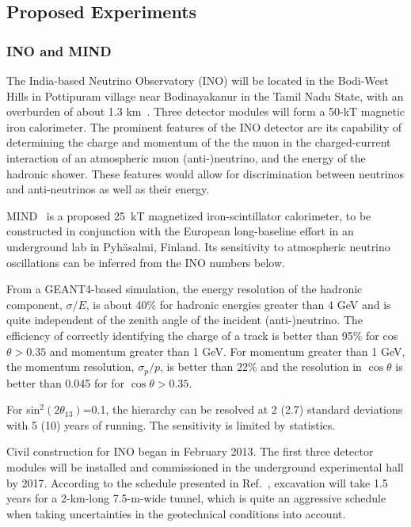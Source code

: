 \subsection{Proposed Experiments}\label{atm:expts}

\subsubsection{INO and MIND}

The India-based Neutrino Observatory (INO) will be located in the Bodi-West Hills in Pottipuram village
near Bodinayakanur in the Tamil Nadu State, with an overburden of about
1.3 km~\cite{atm:Dighe}.  Three
detector modules will form a 50-kT magnetic iron calorimeter.   The prominent features of the INO detector are its
capability of determining the charge and momentum of the the muon in
the charged-current interaction of an atmospheric muon
(anti-)neutrino, and the energy of the hadronic shower.  These
features would allow for discrimination between neutrinos and
anti-neutrinos as well as their energy.

MIND~\cite{nonus:LBNO_LOI} is a proposed 25~kT magnetized
iron-scintillator calorimeter, to be constructed in conjunction with
the European long-baseline effort in an underground lab in
Pyh\"asalmi, Finland. Its sensitivity to atmospheric neutrino
oscillations can be inferred from the INO numbers below. 

From a GEANT4-based simulation, the energy resolution of the hadronic
component, $\sigma/E$, is about 40\% for hadronic energies greater
than 4 GeV and is quite independent of the zenith angle of the
incident (anti-)neutrino.  The efficiency of correctly identifying the
charge of a track is better than 95\% for cos$\theta>0.35$ and
momentum greater than 1 GeV.  For momentum greater than 1 GeV, the
momentum resolution, $\sigma_p/p$, is better than 22\% and the
resolution in $\cos\theta$ is better than 0.045 for for
$\cos\theta>0.35$.


For sin$^2(2\theta_{13})$=0.1, the hierarchy can be resolved at 2
(2.7) standard deviations with 5 (10) years of running. The
sensitivity is limited by statistics. 

Civil construction for INO began in February 2013.  The first three detector
modules will be installed and commissioned in the underground
experimental hall by 2017. According to the schedule presented in Ref.~\cite{atm:Dighe},
excavation will take 1.5 years for a 2-km-long 7.5-m-wide tunnel,
which is quite an aggressive schedule when taking uncertainties in the
geotechnical conditions into account.

